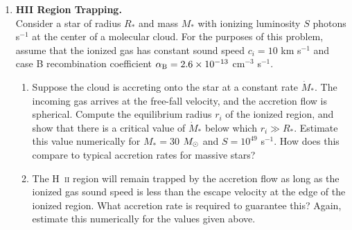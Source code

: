 \problemset

\begin{enumerate}

\item {\bf HII Region Trapping.}\\
Consider a star of radius $R_*$ and mass $M_*$ with ionizing luminosity $S$ photons s$^{-1}$ at the center of a molecular cloud. For the purposes of this problem, assume that the ionized gas has constant sound speed $c_i=10$ km s$^{-1}$ and case B recombination coefficient $\alpha_{\mathrm{B}}=2.6\times 10^{-13}$ cm$^{-3}$ s$^{-1}$.
\begin{enumerate}
\item Suppose the cloud is accreting onto the star at a constant rate $\dot{M}_*$. The incoming gas arrives at the free-fall velocity, and the accretion flow is spherical. Compute the equilibrium radius $r_i$ of the ionized region, and show that there is a critical value of $\dot{M}_*$ below which $r_i \gg R_*$. Estimate this value numerically for $M_*=30$ $M_{\odot}$ and $S=10^{49}$ s$^{-1}$. How does this compare to typical accretion rates for massive stars?
\item The H~\textsc{ii} region will remain trapped by the accretion flow as long as the ionized gas sound speed is less than the escape velocity at the edge of the ionized region. What accretion rate is required to guarantee this? Again, estimate this numerically for the values given above.\\
\end{enumerate}


\end{enumerate}

